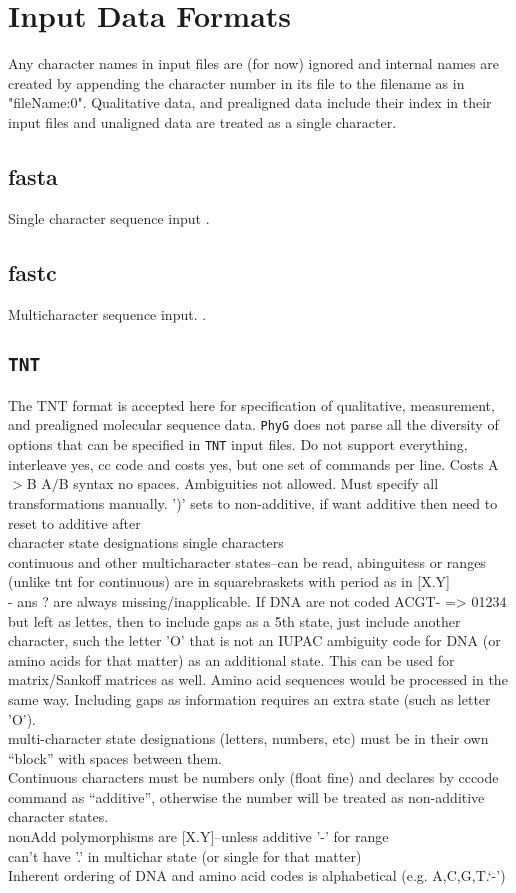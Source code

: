 \documentclass[11pt]{book}
\begin{document}
	\section{Input Data Formats}
	Any character names in input files are (for now) ignored and internal names are created
	by appending the character number in its file to the filename as in "fileName:0".
	Qualitative data, and prealigned data include their index in their input files and unaligned 
	data are treated as a single character.
	
	\subsection{fasta}
	Single character sequence input \citep{PearsonandLipman1988}.
	\subsection{fastc}
	Multicharacter sequence input.  \citep{WheelerandWashburn2019}.
	\subsection{\texttt{TNT}}
	The TNT \citep{Goloboffetal2008} format is accepted here for specification of qualitative,
	measurement, and prealigned molecular sequence data.  \texttt{PhyG} does not parse all the
	diversity of options that can be specified in \texttt{TNT} input files.
	Do not support everything, interleave yes, cc code and costs yes, but one set of commands per line.
	Costs A$>$B A$/$B syntax no spaces. Ambiguities not allowed.  Must specify all transformations manually.
	')' sets to non-additive, if want additive then need to reset to additive after\\
	character state designations single characters\\
	continuous and other multicharacter states--can be read, abinguitess or ranges (unlike tnt for continuous) are 
	in squarebraskets with period as in [X.Y]\\
	- ans ? are always missing/inapplicable.  If DNA are not coded ACGT- => 01234 but left as lettes,
	then to include gaps as a 5th state, just include another character, such the letter 'O' that is not an IUPAC ambiguity code for DNA (or amino acids for that matter) as an additional state.  This can be used for matrix/Sankoff matrices as well.
	Amino acid sequences would be processed in the same way.  Including gaps as information requires
	an extra state (such as letter 'O').\\ 
	multi-character state designations (letters, numbers, etc) must be in their own ``block'' with spaces 
	between them.\\
	Continuous characters must be numbers only (float fine) and declares by cccode command as 
	``additive'', otherwise the number will be treated as non-additive character states. \\
	nonAdd polymorphisms  are [X.Y]--unless  additive '-' for range\\
	can't have '.' in multichar state (or single for that matter)\\
	Inherent ordering of DNA and amino acid codes is alphabetical (e.g. A,C,G,T.`-')
	
\end{document}
